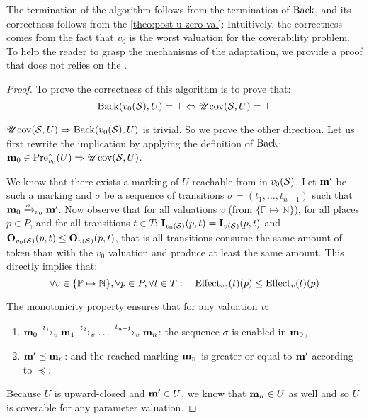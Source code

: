 The termination of the algorithm follows from the termination of $\back$, and its correctness follows from the \autoref{theo:post-u-zero-val}:
Intuitively, the correctness comes from the fact that $v_0$ is the worst valuation for the coverability problem.
To help the reader to grasp the mechanisms of the adaptation, we provide a proof that does not relies on the .
\begin{proof}
  To prove the correctness of this algorithm is to prove that:
  \[
    \back(v_0(\PPN), U) = \top \Leftrightarrow \UcovOp(\PPN, U) = \top
  \]

$\UcovOp(\PPN, U) \Rightarrow \back(v_0(\PPN), U)$ is trivial. So we prove the other direction. Let us first rewrite the implication by applying the definition of $\back$: $\mari \in \Pre_{v_0}^*(U) \Rightarrow \UcovOp(\PPN, U)$.


  We know that there exists a marking of $U$ reachable from \mari in $v_0(\PPN)$.
  Let $\marp$ be such a marking and $\sigma$ be a sequence of transitions $\sigma = (t_1, \dots, t_{n-1})$ such that $\mari \fire[{v_0}]{\sigma} \marp$.
  Now observe that for all valuations $v$ (from $\{\mathbb{P} \mapsto \mathbb{N}\}$), for all places $p \in P$, and for all transitions $t \in T$: $\matI_{v_0(\PPN)}(p,t) = \matI_{v(\PPN)}(p,t)$ and $\matO_{v_0(\PPN)}(p,t) \leq \matO_{v(\PPN)}(p,t)$, that is all transitions consume the same amount of token than with the $v_0$ valuation and produce at least the same amount. This directly implies that: 
  \[
    \forall v \in \{\mathbb{P} \mapsto \mathbb{N}\}, \forall p \in P, \forall t \in T :
  \quad
  \Effect_{v_0}(t)(p) \leq \Effect_v(t)(p)
  \]

The monotonicity property ensures that for any valuation $v$:
  \begin{enumerate}
    \item $\mari \fire[v]{t_1} \mar_1 \fire[v]{t_2} \dots \fire[v]{t_{n-1}} \mar_n$: the sequence $\sigma$ is enabled  in $\mari$,
    \item $\marp \preceq \mar_n$: and the reached marking $\mar_n$ is greater or equal to $\marp$ according to $\preceq$.
  \end{enumerate}

  Because $U$ is upward-closed and $\marp \in U$, we know that $\mar_n \in U$ as well and so $U$ is coverable for any parameter valuation.
\end{proof}

